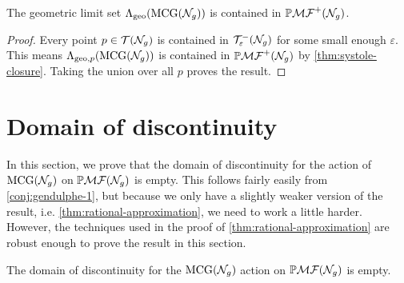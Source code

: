 \documentclass[12pt, reqno]{amsart}
\begin{document}
\begin{corollary}
  \label{cor:geolimset}
  The geometric limit set $\Lambda_{\mathrm{geo}}(\mathrm{MCG}(\mathcal{N}_g))$ is contained in $\mathbb{P}\mathcal{MF}^+(\mathcal{N}_g)$.
\end{corollary}
\begin{proof}
  Every point $p \in \mathcal{T}(\mathcal{N}_g)$ is contained in $\mathcal{T}_{\varepsilon}^{-}(\mathcal{N}_g)$ for some small enough $\varepsilon$.
  This means $\Lambda_{\mathrm{geo}, p}(\mathrm{MCG}(\mathcal{N}_g))$ is contained in $\mathbb{P}\mathcal{MF}^+(\mathcal{N}_g)$ by \autoref{thm:systole-closure}.
  Taking the union over all $p$ proves the result.
\end{proof}

\section{Domain of discontinuity}
\label{sec:domain-discontinuity}

In this section, we prove that the domain of discontinuity for the action of $\mathrm{MCG}(\mathcal{N}_g)$ on $\mathbb{P}\mathcal{MF}(\mathcal{N}_g)$ is empty.
This follows fairly easily from \autoref{conj:gendulphe-1}, but because we only have a slightly weaker version of the result, i.e. \autoref{thm:rational-approximation}, we need to work a little harder.
However, the techniques used in the proof of \autoref{thm:rational-approximation} are robust enough to prove the result in this section.
\begin{theorem}
  \label{thm:dod-is-empty}
  The domain of discontinuity for the $\mathrm{MCG}(\mathcal{N}_g)$ action on $\mathbb{P}\mathcal{MF}(\mathcal{N}_g)$ is empty.
\end{theorem}
\end{document}

